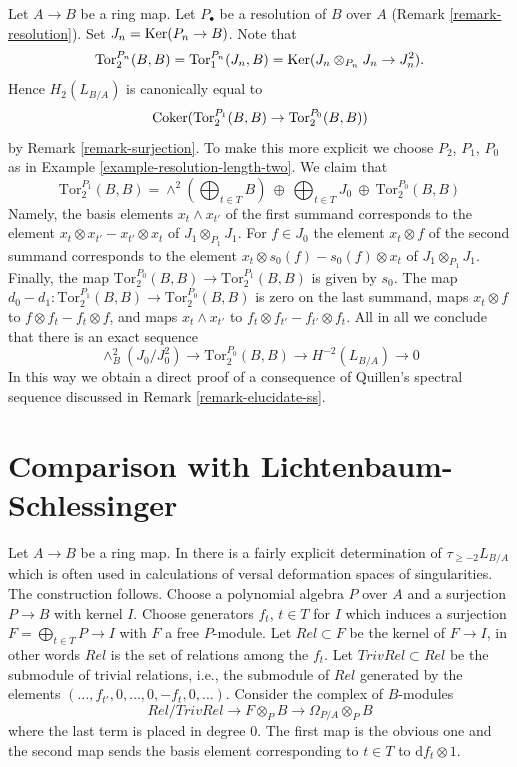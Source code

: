 \begin{remark}
\label{remark-elucidate-degree-two}
Let $A \to B$ be a ring map. Let $P_\bullet$ be a resolution of
$B$ over $A$ (Remark \ref{remark-resolution}).
Set $J_n = \mathop{\mathrm{Ker}}(P_n \to B)$. Note that
$$
\text{Tor}_2^{P_n}(B, B) = 
\text{Tor}_1^{P_n}(J_n, B) =
\mathop{\mathrm{Ker}}(J_n \otimes_{P_n} J_n \to J_n^2).
$$
Hence $H_2(L_{B/A})$ is canonically equal to
$$
\mathop{\mathrm{Coker}}(\text{Tor}_2^{P_1}(B, B) \to \text{Tor}_2^{P_0}(B, B))
$$
by Remark \ref{remark-surjection}. To make this more explicit we choose
$P_2$, $P_1$, $P_0$ as in Example \ref{example-resolution-length-two}.
We claim that
$$
\text{Tor}_2^{P_1}(B, B) =
\wedge^2(\bigoplus\nolimits_{t \in T} B)\ \oplus
\ \bigoplus\nolimits_{t \in T} J_0\ \oplus
\ \text{Tor}_2^{P_0}(B, B)
$$
Namely, the basis elements $x_t \wedge x_{t'}$ of the first summand
corresponds to the element $x_t \otimes x_{t'} - x_{t'} \otimes x_t$
of $J_1 \otimes_{P_1} J_1$. For $f \in J_0$ the element $x_t \otimes f$
of the second summand corresponds to the element
$x_t \otimes s_0(f) - s_0(f) \otimes x_t$ of $J_1 \otimes_{P_1} J_1$.
Finally, the map $\text{Tor}_2^{P_0}(B, B) \to \text{Tor}_2^{P_1}(B, B)$
is given by $s_0$. The map
$d_0 - d_1 : \text{Tor}_2^{P_1}(B, B) \to \text{Tor}_2^{P_0}(B, B)$
is zero on the last summand, maps $x_t \otimes f$ to
$f \otimes f_t - f_t \otimes f$, and maps $x_t \wedge x_{t'}$
to $f_t \otimes f_{t'} - f_{t'} \otimes f_t$. All in all we conclude
that there is an exact sequence
$$
\wedge^2_B(J_0/J_0^2) \to \text{Tor}_2^{P_0}(B, B) \to H^{-2}(L_{B/A}) \to 0
$$
In this way we obtain a direct proof of a consequence of Quillen's spectral
sequence discussed in Remark \ref{remark-elucidate-ss}.
\end{remark}






\section{Comparison with Lichtenbaum-Schlessinger}
\label{section-compare-higher}

\noindent
Let $A \to B$ be a ring map. In \cite{Lichtenbaum-Schlessinger}
there is a fairly explicit determination of $\tau_{\geq -2}L_{B/A}$
which is often used in calculations of versal deformation spaces of
singularities. The construction follows.
Choose a polynomial algebra $P$ over $A$
and a surjection $P \to B$ with kernel $I$. Choose generators
$f_t$, $t \in T$ for $I$ which induces a surjection
$F = \bigoplus_{t \in T} P \to I$ with $F$ a free $P$-module.
Let $Rel \subset F$ be the kernel of $F \to I$, in other words
$Rel$ is the set of relations among the $f_t$. Let $TrivRel \subset Rel$
be the submodule of trivial relations, i.e., the submodule of $Rel$
generated by the elements $(\ldots, f_{t'}, 0, \ldots, 0, -f_t, 0, \ldots)$.
Consider the complex of $B$-modules
\begin{equation}
\label{equation-lichtenbaum-schlessinger}
Rel/TrivRel \longrightarrow
F \otimes_P B \longrightarrow
\Omega_{P/A} \otimes_P B
\end{equation}
where the last term is placed in degree $0$. The first map is the obvious
one and the second map sends the basis element corresponding to $t \in T$
to $\text{d}f_t \otimes 1$.

